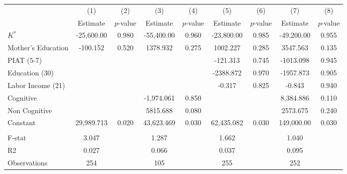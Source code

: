 \begin{tabular}{lcccccccc} \toprule
 & (1) & (2) & (3) & (4) & (5) & (6) & (7) & (8) \\
 & Estimate  & $p$-value  & Estimate  & $p$-value  & Estimate  & $p$-value  & Estimate  & $p$-value  \\  \midrule
$K^\ast$ & -25,600.00 &     0.980 & -55,400.00 &     0.960 & -23,800.00 &     0.985 & -49,200.00 &     0.955 \\
Mother's Education &  -100.152 &     0.520 &  1378.932 &     0.275 &  1002.227 &     0.285 &  3547.563 &     0.135 \\
PIAT (5-7) &         &         &         &         &  -121.313 &     0.745 & -1013.098 &     0.945 \\
Education (30) &         &         &         &         & -2388.872 &     0.970 & -1957.873 &     0.905 \\
Labor Income (21) &         &         &         &         &    -0.317 &     0.825 &    -0.843 &     0.940 \\
Cognitive &         &         & -1,974.061 &     0.850 &         &         &  8,384.886 &     0.110 \\
Non Cognitive &         &         &  5815.688 &     0.080 &         &         &  2573.675 &     0.240 \\
Constant & 29,989.713 &     0.020 & 43,623.469 &     0.030 & 62,435.082 &     0.030 &  149,000.00 &     0.030 \\  \\ \midrule
F-stat &     3.047 &         &     1.287 &         &     1.662 &         &     1.040 &         \\
R2 &     0.027 &         &     0.066 &         &     0.037 &         &     0.095 &         \\
Observations &   254 &         &   105  &         &   255  &         &   252  &         \\
\bottomrule \end{tabular}
